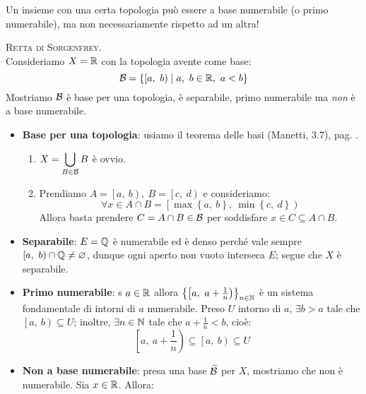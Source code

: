 \begin{attention}
Un insieme con una certa topologia può essere a base numerabile (o primo numerabile), ma non necessariamente rispetto ad un altra!
\end{attention}
\begin{example}
\textsc{Retta di Sorgenfrey}.\\
Consideriamo $X=\mathbb{R}$ con la topologia avente come base:
\begin{equation}
\basis=\left\{\left[a,\ b\right)\mid a,\ b\in\realset,\ a<b\right\}
\end{equation}
Mostriamo $\mathcal{B}$ è base per una topologia, è separabile, primo numerabile ma \textit{non} è a base numerabile.
\begin{itemize}
	\item \textbf{Base per una topologia}: usiamo il teorema delle basi (Manetti, 3.7), pag. \pageref{teoremabasi}.
	\begin{enumerate}[label=\Roman*]
		\item $\displaystyle X=\bigcup_{B\in \mathcal{B}}B$ è ovvio.
		\item Prendiamo $A=\left[a,\ b\right),\ B=\left[c,\ d\right)$ e consideriamo:
		\begin{equation*}
			\forall x\in A\cap B=\left[\max\left\{a,\ b\right\},\ \min\left\{c,\ d\right\}\right)
		\end{equation*}
	Allora basta prendere $C=A\cap B\in\mathcal{B}$ per soddisfare $x\in C\subseteq A\cap B$.
	\end{enumerate}
\item \textbf{Separabile}: $E=\mathbb{Q}$ è numerabile ed è denso perché vale sempre $\left[a,\ b\right)\cap \mathbb{Q} \neq \varnothing$, dunque ogni aperto non vuoto interseca $E$; segue che $X$ è separabile.
\item \textbf{Primo numerabile}: s $a\in\mathbb{R}$ allora $\left\{\left[a,\ a+\frac{1}{n}\right)\right\}_{n\in\naturalset}$ è un sistema fondamentale di intorni di $a$ numerabile. Preso $U$ intorno di $a$, $\exists b>a$ tale che $\left[a,\ b\right)\subseteq U$; inoltre, $\exists n\in\mathbb{N}$ tale che $a+\frac{1}{n}<b$, cioè:
\begin{equation*}
\left[a,\ a+\frac{1}{n}\right)\subseteq\left[a,\ b\right)\subseteq U
\end{equation*}
\item \textbf{Non a base numerabile}: presa una base $\widetilde{\mathcal{B}}$ per $X$, mostriamo che non è numerabile. Sia $x\in\mathbb{R}$. Allora:
\begin{equation*}

\end{equation*}
\end{itemize}
\end{example}
